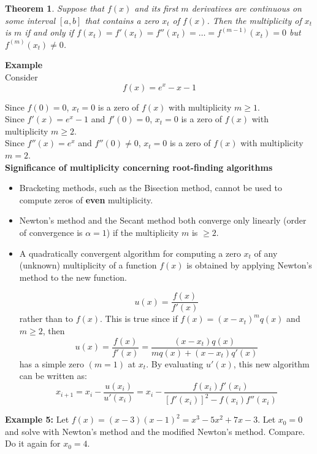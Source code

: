 \documentclass [titlepage,12pt,letter] {article}
\newtheorem{theorem}{Theorem}
\begin{document}
\noindent 
\begin{theorem}

Suppose that $f(x)$ and its first $m$ derivatives are continuous on some
interval $[a,b]$ that contains a zero $x_t$ of $f(x)$. Then the
multiplicity of $x_t$ is $m$ if and only if $f(x_t)= f'(x_t) = f''(x_t) = \dots =
f^{(m-1)}(x_t)=0$ but $f^{(m)}(x_t) \neq 0$.
\end{theorem} 

\noindent 
{\bf Example} \\
Consider 
\[ 
f(x) = e^{x} - x - 1
\]

Since $f(0)=0$, $x_t =0$ is a zero of $f(x)$ with multiplicity $m \geq 1.$ \\ 
Since $f'(x) = e^x - 1$ and $f'(0) = 0$, $x_t = 0$ is a zero of $f(x)$ with multiplicity $m \geq 2$. \\
Since $f''(x) = e^{x}$ and $f''(0) \neq 0$, $x_t = 0$ is a zero of $f(x)$ with multiplicity $m=2$. 
\\ 

\newpage
\noindent 
{\bf Significance of multiplicity concerning root-finding algorithms} 

\begin{itemize} 
\item Bracketing methods, such as the Bisection method, cannot be used to compute zeros of {\bf even} multiplicity. 

\item Newton's method and the Secant method both converge only linearly (order of convergence is $\alpha = 1$) if the multiplicity $m$ is $\geq 2$. 

\item A quadratically convergent algorithm for computing a zero $x_t$ of any (unknown) multiplicity of a function $f(x)$ is obtained by applying Newton’s method to the new function. 

\[
u(x) = \frac{f(x)}{f'(x)} 
\] 
\noindent 
rather than to $f(x)$. This is true since if $f(x) = (x-x_t)^m q(x)$ and $m \geq 2$, then 
\[
u(x) = \frac{f(x)}{f'(x)} = \frac{(x - x_t) q(x) }{ m q(x) + (x - x_t) q'(x)}
\] 
\noindent 
has a simple zero $(m=1)$ at $x_t$. By evaluating $u'(x)$, this new algorithm can be written as: 
\[
x_{i+1} = x_i - \frac{u(x_i)}{u'(x_i)} = x_i - \frac{f(x_i)f'(x_i)}{[f'(x_i)]^2 - f(x_i)f''(x_i)}
\]

\end{itemize} 

{\bf Example 5:} Let $f(x)=(x-3)(x-1)^2=x^3-5x^2+7x-3$. Let $x_0 = 0$ and solve with Newton's method and the modified Newton's method. Compare. Do it again for $x_0 = 4$.
\end{document}
